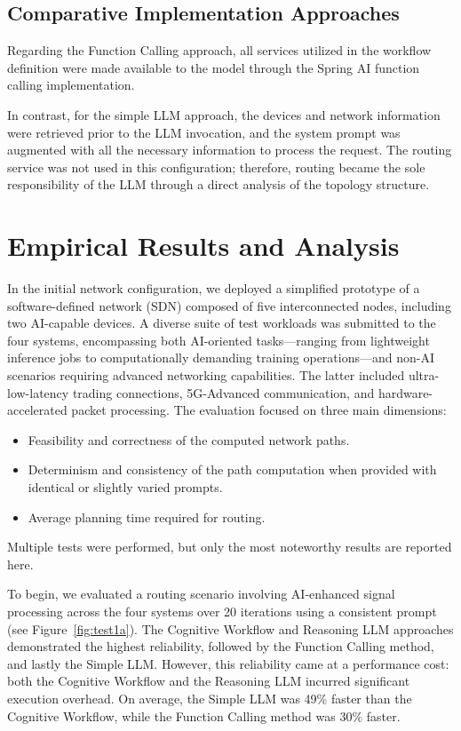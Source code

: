 \subsection{Comparative Implementation Approaches}
Regarding the Function Calling approach, all services utilized in the workflow definition were made available to the model through the Spring AI function calling implementation.

In contrast, for the simple LLM approach, the devices and network information were retrieved prior to the LLM invocation, and the system prompt was augmented with all the necessary information to process the request. The routing service was not used in this configuration; therefore, routing became the sole responsibility of the LLM through a direct analysis of the topology structure.


\section{Empirical Results and Analysis}\label{sec:AI4NE_res}

In the initial network configuration, we deployed a simplified prototype of a software-defined network (SDN) composed of five interconnected nodes, including two AI-capable devices. A diverse suite of test workloads was submitted to the four systems, encompassing both AI-oriented tasks—ranging from lightweight inference jobs to computationally demanding training operations—and non-AI scenarios requiring advanced networking capabilities. The latter included ultra-low-latency trading connections, 5G-Advanced communication, and hardware-accelerated packet processing. The evaluation focused on three main dimensions:

\begin{itemize}[leftmargin=*, label=--]
\item Feasibility and correctness of the computed network paths.
\item Determinism and consistency of the path computation when provided with identical or slightly varied prompts.
\item Average planning time required for routing.
\end{itemize}

Multiple tests were performed, but only the most noteworthy results are reported here.

To begin, we evaluated a routing scenario involving AI-enhanced signal processing across the four systems over 20 iterations using a consistent prompt (see Figure~\ref{fig:test1a}). The Cognitive Workflow and Reasoning LLM approaches demonstrated the highest reliability, followed by the Function Calling method, and lastly the Simple LLM. However, this reliability came at a performance cost: both the Cognitive Workflow and the Reasoning LLM incurred significant execution overhead. On average, the Simple LLM was 49\% faster than the Cognitive Workflow, while the Function Calling method was 30\% faster.

